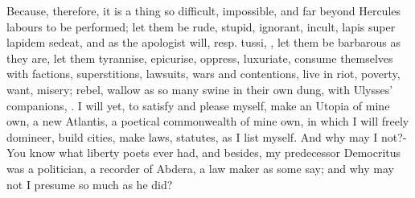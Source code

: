 Because, therefore, it is a thing so difficult, impossible, and far
beyond Hercules labours to be performed; let them be rude, stupid,
ignorant, incult, lapis super lapidem sedeat, and as the apologist
will, resp. tussi, , let them be
barbarous as they are, let them tyrannise, epicurise, oppress,
luxuriate, consume themselves with factions, superstitions, lawsuits,
wars and contentions, live in riot, poverty, want, misery; rebel,
wallow as so many swine in their own dung, with Ulysses' companions,
. I will yet, to satisfy and please myself,
make an Utopia of mine own, a new Atlantis, a poetical commonwealth of
mine own, in which I will freely domineer, build cities, make laws,
statutes, as I list myself. And why may I not?- You know what liberty poets ever had, and besides, my
predecessor Democritus was a politician, a recorder of Abdera, a law
maker as some say; and why may not I presume so much as he did?

